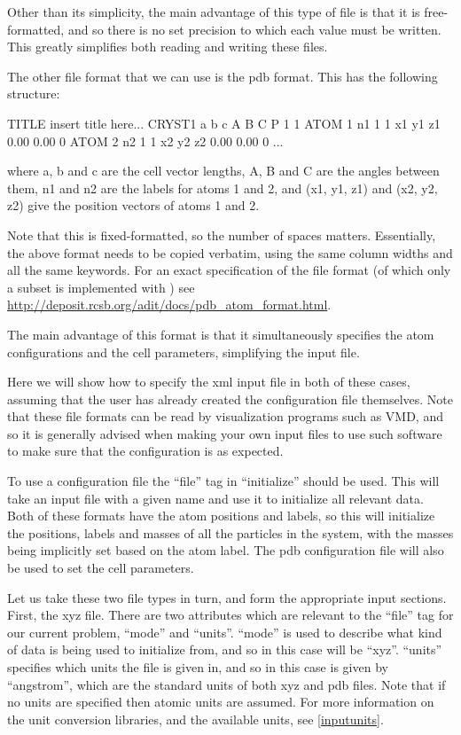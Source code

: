 \documentclass[11pt,english,fleqn]{report}
\newenvironment{code}{%
\footnotesize 
\verbatim
}{
\endverbatim
\normalsize
}
\begin{document}
Other than its simplicity, the main advantage of this type of file
is that it is free-formatted, and so there is no set precision
to which each value must be written. This greatly simplifies
both reading and writing these files.

The other file format that we can use is the pdb format. This
has the following structure:

\begin{code}
TITLE insert title here...
CRYST1        a        b        c      A      B      C P 1           1
ATOM      1   n1   1     1          x1      y1      z1  0.00  0.00             0
ATOM      2   n2   1     1          x2      y2      z2  0.00  0.00             0
...
\end{code}
where a, b and c are the cell vector lengths, A, B and C are the angles between
them, n1 and n2 are the labels for atoms 1 and 2, and (x1, y1, z1)
and (x2, y2, z2) give the position vectors of atoms 1 and 2. 

Note that this is
fixed-formatted, so the number of spaces matters. Essentially, the
above format needs to be copied verbatim, using the same column
widths and all the same keywords. For an exact specification
of the file format (of which only a subset is implemented 
with \ipi) see
\url{http://deposit.rcsb.org/adit/docs/pdb_atom_format.html}.

The main advantage of this format is that it simultaneously specifies
the atom configurations and the cell parameters, simplifying
the input file.

Here we will show how to specify the xml input file
in both of these cases, assuming that the user has already
created the configuration file themselves.
Note that these file formats can be read by
visualization programs such as VMD, and so it is generally advised 
when making your own input files to
use such software to make sure that the configuration is as expected.

To use a configuration file the {}``file'' tag in {}``initialize'' should be used.
This will take an input file with a given name and use it to initialize
all relevant data. Both of these formats have the atom
positions and labels, so this will initialize the positions, labels
and masses of all the particles in the system, with the masses being
implicitly set based on the atom label. The pdb configuration file
will also be used to set the cell parameters.

Let us take these two file types in turn, and form the appropriate
input sections. First, the xyz file. 
There are two attributes which are relevant to the {}``file'' tag
for our current problem, {}``mode'' and {}``units''.
{}``mode'' is used to describe what kind of data is being used to
initialize from, and so in this case will be {}``xyz''.
{}``units'' specifies which units the file is given in, and
so in this case is given by {}``angstrom'', which are the
standard units of both xyz and pdb files. 
Note that if no units are specified then atomic units are assumed.
For more information on the \ipi unit conversion libraries, 
and the available units, see \ref{inputunits}.
\end{document}
